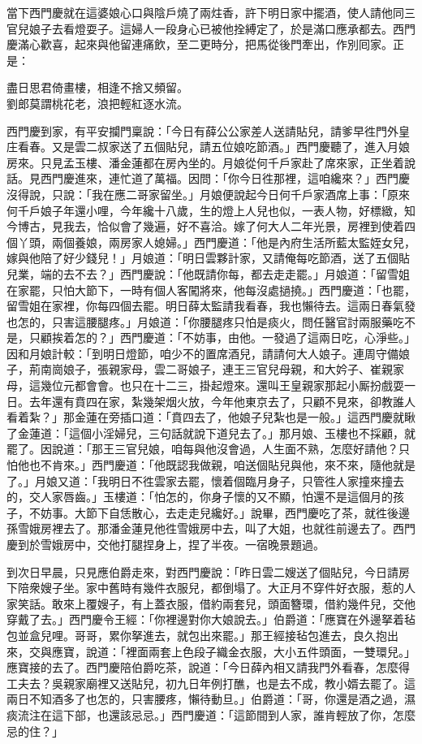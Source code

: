 當下西門慶就在這婆娘心口與陰戶燒了兩炷香，許下明日家中擺酒，使人請他同三官兒娘子去看燈耍子。這婦人一段身心已被他拴縛定了，於是滿口應承都去。西門慶滿心歡喜，起來與他留連痛飲，至二更時分，把馬從後門牽出，作別囘家。正是：

\begin{myquote}
盡日思君倚畫樓，相逢不捨又頻留。\\劉郎莫謂桃花老，浪把輕紅逐水流。
\end{myquote}

西門慶到家，有平安攔門稟說：「今日有薛公公家差人送請貼兒，請爹早徃門外皇庄看春。又是雲二叔家送了五個貼兒，請五位娘吃節酒。」西門慶聽了，進入月娘房來。只見孟玉樓、潘金蓮都在房內坐的。月娘從何千戶家赴了席來家，正坐着說話。見西門慶進來，連忙道了萬福。因問：「你今日徃那裡，這咱纔來？」西門慶沒得說，只說：「我在應二哥家留坐。」月娘便說起今日何千戶家酒席上事：「原來何千戶娘子年還小哩，今年纔十八歲，生的燈上人兒也似，一表人物，好標緻，知今博古，見我去，恰似會了幾遍，好不喜洽。嫁了何大人二年光景，房裡到使着四個丫頭，兩個養娘，兩房家人媳婦。」西門慶道：「他是內府生活所藍太監姪女兒，嫁與他陪了好少錢兒！」月娘道：「明日雲夥計家，又請俺每吃節酒，送了五個貼兒業，端的去不去？」西門慶說：「他既請你每，都去走走罷。」月娘道：「留雪姐在家罷，只怕大節下，一時有個人客闖將來，他每沒處撾撓。」西門慶道：「也罷，留雪姐在家裡，你每四個去罷。明日薛太監請我看春，我也懶待去。這兩日春氣發也怎的，只害這腰腿疼。」月娘道：「你腰腿疼只怕是痰火，問任醫官討兩服藥吃不是，只顧挨着怎的？」西門慶道：「不妨事，由他。一發過了這兩日吃，心淨些。」因和月娘計較：「到明日燈節，咱少不的置席酒兒，請請何大人娘子。連周守備娘子，荊南崗娘子，張親家母，雲二哥娘子，連王三官兒母親，和大妗子、崔親家母，這幾位元都會會。也只在十二三，掛起燈來。還叫王皇親家那起小厮扮戲耍一日。去年還有賁四在家，紮幾架烟火放，今年他東京去了，只顧不見來，卻教誰人看着紮？」那金蓮在旁插口道：「賁四去了，他娘子兒紮也是一般。」{}這西門慶就瞅了金蓮道：「這個小淫婦兒，三句話就說下道兒去了。」那月娘、玉樓也不採顧，就罷了。因說道：「那王三官兒娘，咱每與他沒會過，人生面不熟，怎麼好請他？只怕他也不肯來。」西門慶道：「他既認我做親，咱送個貼兒與他，來不來，隨他就是了。」月娘又道：「我明日不徃雲家去罷，懷着個臨月身子，只管徃人家撞來撞去的，交人家唇齒。」玉樓道：「怕怎的，你身子懷的又不顯，怕還不是這個月的孩子，不妨事。大節下自恁散心，去走走兒纔好。」說畢，西門慶吃了茶，就徃後邊孫雪娥房裡去了。那潘金蓮見他徃雪娥房中去，叫了大姐，也就徃前邊去了。西門慶到於雪娥房中，交他打腿捏身上，捏了半夜。{}一宿晚景題過。

到次日早晨，只見應伯爵走來，對西門慶說：「昨日雲二嫂送了個貼兒，今日請房下陪衆嫂子坐。家中舊時有幾件衣服兒，都倒塌了。大正月不穿件好衣服，惹的人家笑話。敢來上覆嫂子，有上蓋衣服，借約兩套兒，頭面簪環，借約幾件兒，交他穿戴了去。」西門慶令王經：「你裡邊對你大娘說去。」伯爵道：「應寶在外邊拏着毡包並盒兒哩。哥哥，累你拏進去，就包出來罷。」那王經接毡包進去，良久抱出來，交與應寶，說道：「裡面兩套上色段子織金衣服，大小五件頭面，一雙環兒。」{}應寶接的去了。西門慶陪伯爵吃茶，說道：「今日薛內相又請我門外看春，怎麼得工夫去？吳親家廟裡又送貼兒，初九日年例打醮，也是去不成，教小婿去罷了。這兩日不知酒多了也怎的，只害腰疼，懶待動旦。」伯爵道：「哥，你還是酒之過，濕痰流注在這下部，也還該忌忌。」西門慶道：「這節間到人家，誰肯輕放了你，怎麼忌的住？」

